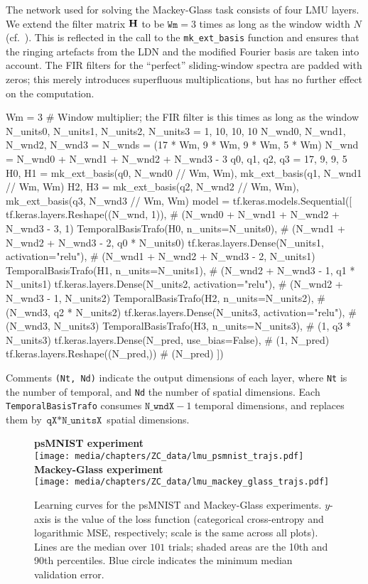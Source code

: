 The network used for solving the Mackey-Glass task consists of four LMU layers.
We extend the filter matrix $\mathbf{H}$ to be $\texttt{Wm} = 3$ times as long as the window width $N$ (cf.~).
This is reflected in the call to the \texttt{mk\_ext\_basis} function and ensures that the ringing artefacts from the LDN and the modified Fourier basis are taken into account.
The FIR filters for the \enquote{perfect} sliding-window spectra are padded with zeros; this merely introduces superfluous multiplications, but has no further effect on the computation.
\begin{pythoncode}
Wm = 3 # Window multiplier; the FIR filter is this times as long as the window
N_units0, N_units1, N_units2, N_units3 = 1, 10, 10, 10
N_wnd0, N_wnd1, N_wnd2, N_wnd3 = N_wnds = (17 * Wm, 9 * Wm, 9 * Wm, 5 * Wm)
N_wnd = N_wnd0 + N_wnd1 + N_wnd2 + N_wnd3 - 3
q0, q1, q2, q3 = 17, 9, 9, 5
H0, H1 = mk_ext_basis(q0, N_wnd0 // Wm, Wm), mk_ext_basis(q1, N_wnd1 // Wm, Wm)
H2, H3 = mk_ext_basis(q2, N_wnd2 // Wm, Wm), mk_ext_basis(q3, N_wnd3 // Wm, Wm)
model = tf.keras.models.Sequential([
  tf.keras.layers.Reshape((N_wnd, 1)),
  # (N_wnd0 + N_wnd1 + N_wnd2 + N_wnd3 - 3, 1)
  TemporalBasisTrafo(H0, n_units=N_units0),
  # (N_wnd1 + N_wnd2 + N_wnd3 - 2, q0 * N_units0)
  tf.keras.layers.Dense(N_units1, activation="relu"),
  # (N_wnd1 + N_wnd2 + N_wnd3 - 2, N_units1)
  TemporalBasisTrafo(H1, n_units=N_units1),
  # (N_wnd2 + N_wnd3 - 1, q1 * N_units1)
  tf.keras.layers.Dense(N_units2, activation="relu"),
  # (N_wnd2 + N_wnd3 - 1, N_units2)
  TemporalBasisTrafo(H2, n_units=N_units2),
  # (N_wnd3, q2 * N_units2)
  tf.keras.layers.Dense(N_units3, activation="relu"),
  # (N_wnd3, N_units3)
  TemporalBasisTrafo(H3, n_units=N_units3),
  # (1, q3 * N_units3)
  tf.keras.layers.Dense(N_pred, use_bias=False), # (1, N_pred)
  tf.keras.layers.Reshape((N_pred,)) # (N_pred)
])
\end{pythoncode}
Comments \texttt{(Nt, Nd)} indicate the output dimensions of each layer, where \texttt{Nt} is the number of temporal, and \texttt{Nd} the number of spatial dimensions.
Each \texttt{TemporalBasisTrafo} consumes $\texttt{N\_wndX} - 1$ temporal dimensions, and replaces them by $\texttt{qX} * \texttt{N\_unitsX}$ spatial dimensions.

\begin{figure}
	\sffamily\small
	\centering
	\textbf{psMNIST experiment}\\[0.125cm]
	\texttt{[image: media/chapters/ZC\_data/lmu\_psmnist\_trajs.pdf]}\\[0.25cm]
	\textbf{Mackey-Glass experiment}\\[0.125cm]
	\texttt{[image: media/chapters/ZC\_data/lmu\_mackey\_glass\_trajs.pdf]}
	\caption[Learning curves for the psMNIST and Mackey-Glass experiments]{Learning curves for the psMNIST and Mackey-Glass experiments. $y$-axis is the value of the loss function (categorical cross-entropy and logarithmic MSE, respectively; scale is the same across all plots). Lines are the median over $101$ trials; shaded areas are the 10th and 90th percentiles. Blue circle indicates the minimum median validation error.}
	\label{fig:lmu_trajs}
\end{figure}


